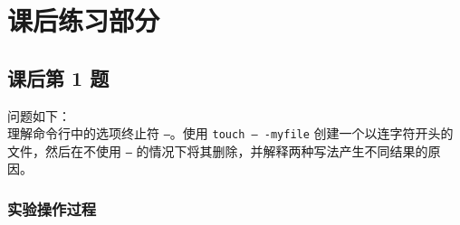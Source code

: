 \documentclass[a4paper,12pt]{report}
\begin{document}
\color{red}\chapter{课后练习部分}\color{black}

\section{课后第 1 题}
\begin{flushleft}
  {\large 问题如下：\\
  理解命令行中的选项终止符 \texttt{--}。使用 \texttt{touch -- -myfile} 创建一个以连字符开头的文件，然后在不使用 \texttt{--} 的情况下将其删除，并解释两种写法产生不同结果的原因。}
\end{flushleft}

\subsection{实验操作过程}
\end{document}

